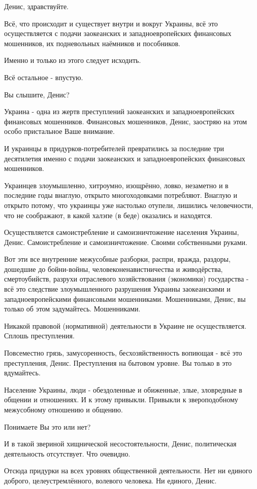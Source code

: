 \begin{itemize}
Денис, здравствуйте.

Всё, что происходит и существует внутри и вокруг Украины, всё это
осуществляется с подачи заокеанских и западноевропейских финансовых мошенников,
их подневольных наёмников и пособников.

Именно и только из этого следует исходить.

Всё остальное - впустую.

Вы слышите, Денис?

Украина - одна из жертв преступлений заокеанских и западноевропейских
финансовых мошенников. Финансовых мошенников, Денис, заостряю на этом особо
пристальное Ваше внимание.

И украинцы в придурков-потребителей превратились за последние три десятилетия
именно с подачи заокеанских и западноевропейских финансовых мошенников.

Украинцев злоумышленно, хитроумно, изощрённо, ловко, незаметно и в последние
годы внаглую, открыто многоходовками потребляют. Внаглую и открыто потому, что
украинцы уже настолько отупели, лишились человечности, что не соображают, в
какой халэпе (в беде) оказались и находятся.

Осуществляется самоистребление и самоизничтожение населения Украины, Денис.
Самоистребление и самоизничтожение. Своими собственными руками.

Вот эти все внутренние межусобные разборки, распри, вражда, раздоры, дошедшие
до бойни-войны, человеконенавистничества и живодёрства, смертоубийств, разрухи
отраслевого хозяйствования (экономики) государства - всё это следствие
злоумышленного разрушения Украины заокеанскими и западноевропейскими
финансовыми мошенниками. Мошенниками, Денис, вы только об этом задумайтесь.
Мошенниками.

Никакой правовой (нормативной) деятельности в Украине не осуществляется. Сплошь
преступления.

Повсеместно грязь, замусоренность, бесхозяйственность вопиющая - всё это
преступления, Денис. Преступления на бытовом уровне. Вы только в это
вдумайтесь.

Население Украины, люди - обездоленные и обиженные, злые, зловредные в общении
и отношениях. И к этому привыкли. Привыкли к звероподобному межусобному
отношению и общению.

Понимаете Вы это или нет?

И в такой звериной хищнической несостоятельности, Денис, политическая
деятельность отсутствует. Что очевидно.

Отсюда придурки на всех уровнях общественной деятельности. Нет ни единого
доброго, целеустремлённого, волевого человека. Ни единого, Денис.


\end{itemize}
